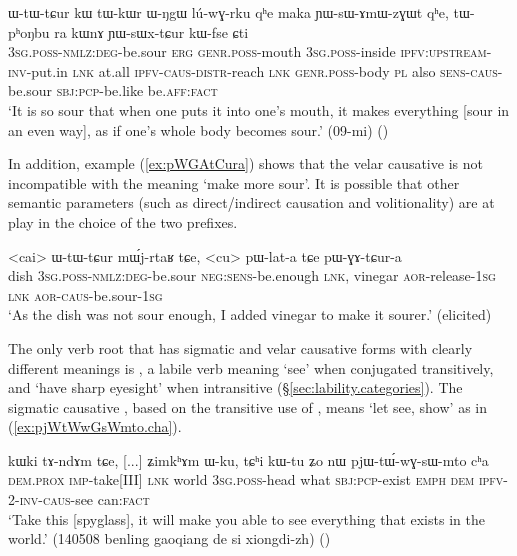  \begin{exe}
\ex \label{ex:YWsWxtCur}
\gll ɯ-tɯ-tɕur kɯ tɯ-kɯr ɯ-ŋgɯ lú-wɣ-rku qʰe maka ɲɯ-sɯ-ɤmɯ-zɣɯt qʰe, tɯ-pʰoŋbu ra kɯnɤ ɲɯ-sɯx-tɕur kɯ-fse ɕti\\
\textsc{3sg}.\textsc{poss}-\textsc{nmlz}:\textsc{deg}-be.sour \textsc{erg} \textsc{genr}.\textsc{poss}-mouth \textsc{3sg}.\textsc{poss}-inside \textsc{ipfv}:\textsc{upstream}-\textsc{inv}-put.in \textsc{lnk} at.all  \textsc{ipfv}-\textsc{caus}-\textsc{distr}-reach \textsc{lnk} \textsc{genr}.\textsc{poss}-body \textsc{pl} also \textsc{sens}-\textsc{caus}-be.sour \textsc{sbj}:\textsc{pcp}-be.like be.\textsc{aff}:\textsc{fact}\\
\glt `It is so sour that when one puts it into one's mouth, it makes everything [sour in an even way], as if one's whole body becomes sour.' (09-mi)
()
\end{exe}

In addition, example (\ref{ex:pWGAtCura}) shows that the velar causative   is not incompatible with the meaning `make more sour'. It is possible that other semantic parameters (such as direct/indirect causation and volitionality) are at play in the choice of the two prefixes.

 \begin{exe}
\ex \label{ex:pWGAtCura}
\gll  <cai> ɯ-tɯ-tɕur mɯ́j-rtaʁ tɕe, <cu> pɯ-lat-a tɕe pɯ-ɣɤ-tɕur-a \\
dish \textsc{3sg}.\textsc{poss}-\textsc{nmlz}:\textsc{deg}-be.sour \textsc{neg}:\textsc{sens}-be.enough \textsc{lnk}, vinegar \textsc{aor}-release-\textsc{1sg} \textsc{lnk} \textsc{aor}-\textsc{caus}-be.sour-\textsc{1sg} \\
\glt `As the dish was not sour enough, I added vinegar to make it sourer.' (elicited)
\end{exe}

The only verb root that has sigmatic and velar causative forms with clearly different meanings is , a labile verb meaning `see' when conjugated transitively, and `have sharp eyesight' when intransitive (§\ref{sec:lability.categories}). The sigmatic causative , based on the transitive use of , means `let see, show' as in (\ref{ex:pjWtWwGsWmto.cha}).


\begin{exe}
\ex \label{ex:pjWtWwGsWmto.cha}
\gll  kɯki tɤ-ndɤm tɕe, [...] ʑimkʰɤm ɯ-ku, tɕʰi kɯ-tu ʑo nɯ pjɯ-tɯ́-wɣ-sɯ-mto cʰa \\
\textsc{dem}.\textsc{prox} \textsc{imp}-take[III] \textsc{lnk} { } world \textsc{3sg}.\textsc{poss}-head what \textsc{sbj}:\textsc{pcp}-exist \textsc{emph} \textsc{dem} \textsc{ipfv}-2-\textsc{inv}-\textsc{caus}-see can:\textsc{fact} \\
\glt `Take this [spyglass], it will make you able to see everything that exists in the world.' (140508 benling gaoqiang de si xiongdi-zh)
()
\end{exe} 

